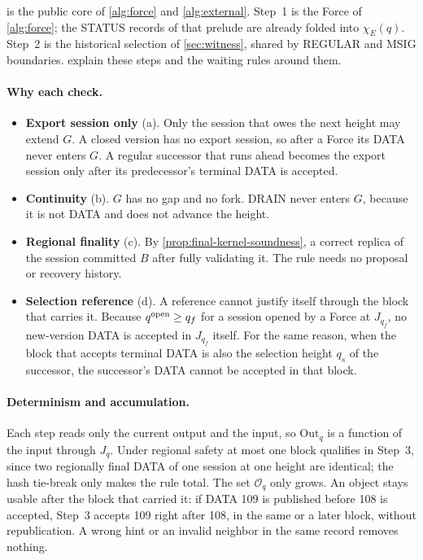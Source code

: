 \documentclass[11pt,a4paper]{article}
\begin{document}
 is the public core of \cref{alg:force} and
\cref{alg:external}. Step~1 is the Force of \cref{alg:force}; the STATUS
records of that prelude are already folded into $\chi_E(q)$. Step~2 is
the historical selection of \cref{sec:witness}, shared by REGULAR and
MSIG boundaries.  explain these steps and
the waiting rules around them.

\paragraph{Why each check.}
\begin{itemize}[itemsep=2pt]
\item \textbf{Export session only} (a). Only the session that owes the
next height may extend $G$. A closed version has no export session, so
after a Force its DATA never enters $G$. A regular successor that runs
ahead becomes the export session only after its predecessor's terminal
DATA is accepted.
\item \textbf{Continuity} (b). $G$ has no gap and no fork. DRAIN never
enters $G$, because it is not DATA and does not advance the height.
\item \textbf{Regional finality} (c). By
\cref{prop:final-kernel-soundness}, a correct replica of the session
committed $B$ after fully validating it. The rule needs no proposal or
recovery history.
\item \textbf{Selection reference} (d). A reference cannot justify itself
through the block that carries it. Because $q^{\rm open}\ge q_f$ for a
session opened by a Force at $J_{q_f}$, no new-version DATA is accepted
in $J_{q_f}$ itself. For the same reason, when the block that accepts
terminal DATA is also the selection height $q_s$ of the successor, the
successor's DATA cannot be accepted in that block.
\end{itemize}

\paragraph{Determinism and accumulation.}
Each step reads only the current output and the input, so
$\mathrm{Out}_q$ is a function of the input through $J_q$. Under regional
safety at most one block qualifies in Step~3, since two regionally final
DATA of one session at one height are identical; the hash tie-break only
makes the rule total. The set $\mathcal O_q$ only grows. An object stays
usable after the block that carried it: if DATA 109 is published before
108 is accepted, Step~3 accepts 109 right after 108, in the same or a
later block, without republication. A wrong hint or an invalid neighbor
in the same record removes nothing.
\end{document}
